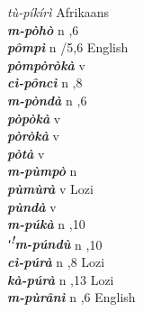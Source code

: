 \begin{multicols}{2}
{{\itshape tù-píkírì}} \relax  Afrikaans \relax  \\
{{\bfseries\itshape m-pòhò}} \relax  n  ,6  \relax   \relax  \\
{{\bfseries\itshape pômpì}} \relax  n  /5,6  \relax  English \relax  \\
{{\bfseries\itshape pòmpòròkà}} \relax  v  \relax   \relax  {} \relax   \relax  \\
{{\bfseries\itshape cì-pôncì}} \relax  n  ,8  \relax   \relax  \\
{{\bfseries\itshape m-pòndà}} \relax  n  ,6  \relax   \relax  \\
{{\bfseries\itshape pòpòkà}} \relax  v  \relax   \relax  {} \relax   \relax  \\
{{\bfseries\itshape pòròkà}} \relax  v  \relax   \relax  {} \relax   \relax  \\
{{\bfseries\itshape pòtà}} \relax  v  \relax   \relax  {} \relax   \relax  \\
{{\bfseries\itshape m-pùmpò}} \relax  n   \relax  {} \relax   \relax  \\
{{\bfseries\itshape pùmùrà}} \relax  v  \relax   \relax  {} \relax  Lozi \relax  \\
{{\bfseries\itshape pùndà}} \relax  v  \relax   \relax  {} \relax   \relax  \\
{{\bfseries\itshape m-púkà}} \relax  n  ,10  \relax   \relax  \\
{{\bfseries\itshape ʹ\textsuperscript{!}m-púndù}} \relax  n  ,10  \relax   \relax  \\
{{\bfseries\itshape cì-púrà}} \relax  n  ,8  \relax  Lozi \relax  \\
{{\bfseries\itshape kà-púrà}} \relax  n  ,13  \relax  Lozi \relax  \\
{{\bfseries\itshape m-pùrânì}} \relax  n  ,6  \relax  English \relax  \\

\end{multicols}
